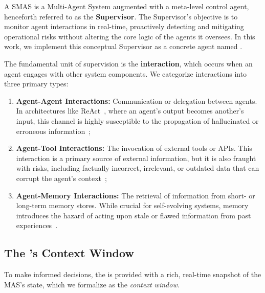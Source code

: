 \begin{definition}
    A SMAS is a Multi-Agent System augmented with a meta-level control agent, henceforth referred to as the \textbf{Supervisor}. The Supervisor's objective is to monitor agent interactions in real-time, proactively detecting and mitigating operational risks without altering the core logic of the agents it oversees. In this work, we implement this conceptual Supervisor as a concrete agent named \textbf{\method}.
\end{definition}

The fundamental unit of supervision is the \textbf{interaction}, which occurs when an agent engages with other system components. We categorize interactions into three primary types:
\begin{enumerate}[nosep, leftmargin=12pt]
    \item \textbf{Agent-Agent Interactions:} Communication or delegation between agents.
          In architectures like ReAct~\citep{yao2023reactsynergizingreasoningacting}, where an agent's output becomes another's input, this channel is highly susceptible to the propagation of hallucinated or erroneous information~\citep{shen2025understandinginformationpropagationeffects};
    \item \textbf{Agent-Tool Interactions:}
          The invocation of external tools or APIs.
          This interaction is a primary source of external information, but it is also fraught with risks, including factually incorrect, irrelevant, or outdated data that can corrupt the agent's context~\citep{qian2025smartselfawareagenttool};
    \item \textbf{Agent-Memory Interactions:}
          The retrieval of information from short- or long-term memory stores.
          While crucial for self-evolving systems, memory introduces the hazard of acting upon stale or flawed information from past experiences~\citep{xiong2025memorymanagementimpactsllm}.
\end{enumerate}


\subsection{The \method's Context Window}


To make informed decisions, the \method is provided with a rich, real-time snapshot of the MAS's state, which we formalize as the \emph{context window}.

